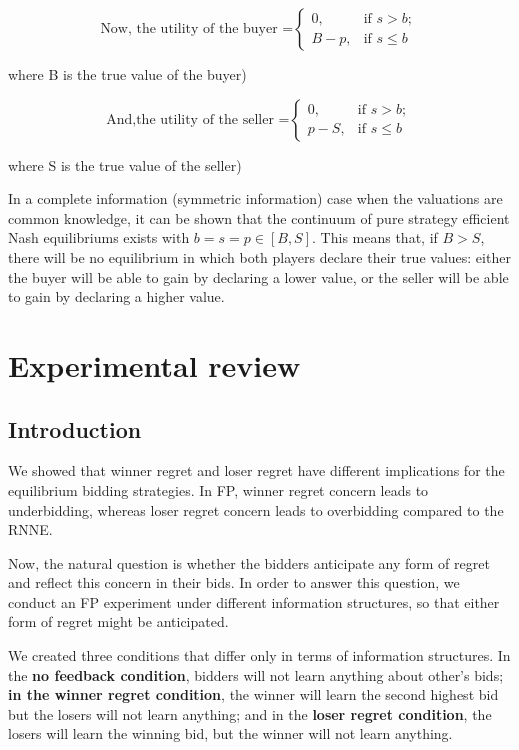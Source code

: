 \documentclass[10pt,a4paper,oneside]{report}
\begin{document}
 \begin{equation*}
 \text{Now, the utility of the buyer =}
 \begin{cases}
 0,& \text{if $s>b$};\\
 B-p,&\text {if $s\leq b$} 
 \end{cases}
 \end{equation*}
	\begin{flushright}
	where B is the true value of the buyer)\end{flushright}
	\begin{equation*}
 \text{And,the utility of the seller =}
 \begin{cases}
 0,& \text{if $s>b$};\\
 p-S,&\text {if $s\leq b$} 
 \end{cases}
 \end{equation*}
	\begin{flushright}
	where S is the true value of the seller)\end{flushright}
In a complete information (symmetric information) case when the valuations are common knowledge, it can be shown that the continuum of pure strategy efficient Nash equilibriums exists with ${\displaystyle b=s=p\in [B,S].}$ This means that, if $B>S$, there will be no equilibrium in which both players declare their true values: either the buyer will be able to gain by declaring a lower value, or the seller will be able to gain by declaring a higher value.

\chapter{Experimental review}
\section{Introduction}
We showed that winner regret and loser regret have different implications for the equilibrium bidding strategies. In FP, winner regret concern leads to underbidding, whereas loser regret concern leads to overbidding compared to the RNNE.

\noindent Now, the natural question is whether the bidders anticipate any form of regret and reflect this concern in their bids. In order to answer this question, we conduct an FP experiment under different information structures, so that either form of regret might be anticipated.

\noindent We created three conditions that differ only in terms of information structures. In the \textbf{no feedback condition}, bidders will not learn anything about other's bids; \textbf{in the winner regret condition}, the winner will learn the second highest bid but the losers will not learn anything; and in the \textbf{loser regret condition}, the losers will learn the winning bid, but the winner will not learn anything.\citep{filizy2005auctions}
\end{document}
